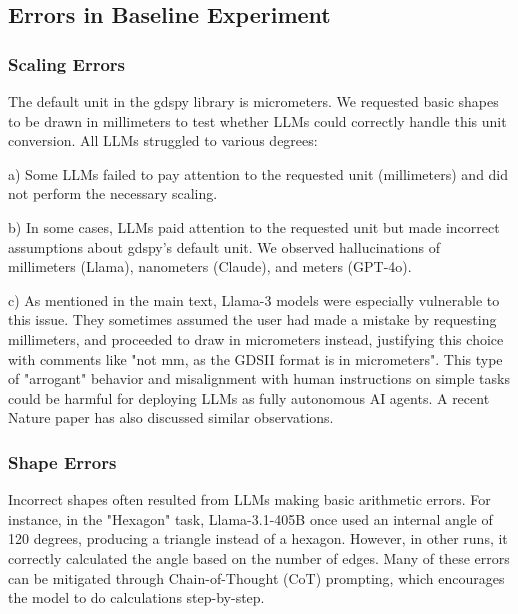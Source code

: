 \documentclass{article}
\begin{document}

\subsection{Errors in Baseline Experiment}
\label{appendix:baseline_errors}

\subsubsection{Scaling Errors}
\label{appendix:scaling_errors}

The default unit in the gdspy library is micrometers. We requested basic shapes to be drawn in millimeters to test whether LLMs could correctly handle this unit conversion. All LLMs struggled to various degrees:

a) Some LLMs failed to pay attention to the requested unit (millimeters) and did not perform the necessary scaling.

b) In some cases, LLMs paid attention to the requested unit but made incorrect assumptions about gdspy's default unit. We observed hallucinations of millimeters (Llama), nanometers (Claude), and meters (GPT-4o).

c) As mentioned in the main text, Llama-3 models were especially vulnerable to this issue. They sometimes assumed the user had made a mistake by requesting millimeters, and proceeded to draw in micrometers instead, justifying this choice with comments like "not mm, as the GDSII format is in micrometers". This type of "arrogant" behavior and misalignment with human instructions on simple tasks could be harmful for deploying LLMs as fully autonomous AI agents. A recent Nature paper \cite{ZhouNature2024} has also discussed similar observations.

\subsubsection{Shape Errors}
\label{appendix:shape_errors}

Incorrect shapes often resulted from LLMs making basic arithmetic errors. For instance, in the "Hexagon" task, Llama-3.1-405B once used an internal angle of 120 degrees, producing a triangle instead of a hexagon. However, in other runs, it correctly calculated the angle based on the number of edges. Many of these errors can be mitigated through Chain-of-Thought (CoT) prompting, which encourages the model to do calculations step-by-step.
\end{document}
